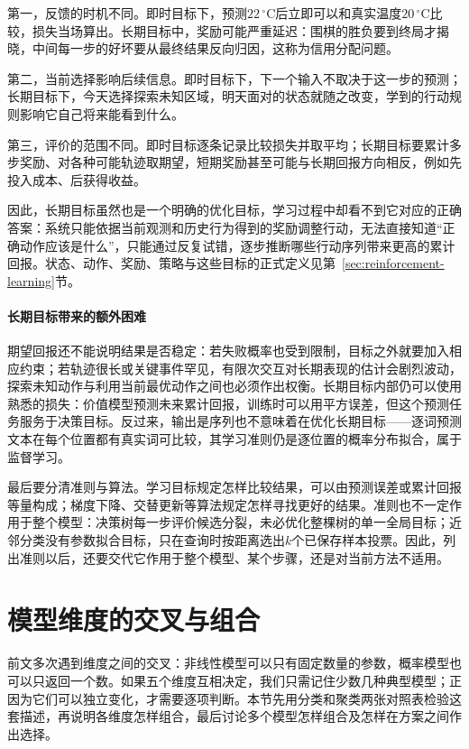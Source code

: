 第一，反馈的时机不同。即时目标下，预测$22\,^{\circ}\mathrm{C}$后立即可以和真实温度$20\,^{\circ}\mathrm{C}$比较，损失当场算出。长期目标中，奖励可能严重延迟：围棋的胜负要到终局才揭晓，中间每一步的好坏要从最终结果反向归因，这称为信用分配问题。

第二，当前选择影响后续信息。即时目标下，下一个输入不取决于这一步的预测；长期目标下，今天选择探索未知区域，明天面对的状态就随之改变，学到的行动规则影响它自己将来能看到什么。

第三，评价的范围不同。即时目标逐条记录比较损失并取平均；长期目标要累计多步奖励、对各种可能轨迹取期望，短期奖励甚至可能与长期回报方向相反，例如先投入成本、后获得收益。

因此，长期目标虽然也是一个明确的优化目标，学习过程中却看不到它对应的正确答案：系统只能依据当前观测和历史行为得到的奖励调整行动，无法直接知道“正确动作应该是什么”，只能通过反复试错，逐步推断哪些行动序列带来更高的累计回报。状态、动作、奖励、策略与这些目标的正式定义见第~\ref{sec:reinforcement-learning}节。

\paragraph{长期目标带来的额外困难}

期望回报还不能说明结果是否稳定：若失败概率也受到限制，目标之外就要加入相应约束；若轨迹很长或关键事件罕见，有限次交互对长期表现的估计会剧烈波动，探索未知动作与利用当前最优动作之间也必须作出权衡。长期目标内部仍可以使用熟悉的损失：价值模型预测未来累计回报，训练时可以用平方误差，但这个预测任务服务于决策目标。反过来，输出是序列也不意味着在优化长期目标——逐词预测文本在每个位置都有真实词可比较，其学习准则仍是逐位置的概率分布拟合，属于监督学习。

最后要分清准则与算法。学习目标规定怎样比较结果，可以由预测误差或累计回报等量构成；梯度下降、交替更新等算法规定怎样寻找更好的结果。准则也不一定作用于整个模型：决策树每一步评价候选分裂，未必优化整棵树的单一全局目标；近邻分类没有参数拟合目标，只在查询时按距离选出$k$个已保存样本投票。因此，列出准则以后，还要交代它作用于整个模型、某个步骤，还是对当前方法不适用。

\FloatBarrier
\section{模型维度的交叉与组合}
\label{sec:models-crossing}

前文多次遇到维度之间的交叉：非线性模型可以只有固定数量的参数，概率模型也可以只返回一个数。如果五个维度互相决定，我们只需记住少数几种典型模型；正因为它们可以独立变化，才需要逐项判断。本节先用分类和聚类两张对照表检验这套描述，再说明各维度怎样组合，最后讨论多个模型怎样组合及怎样在方案之间作出选择。


